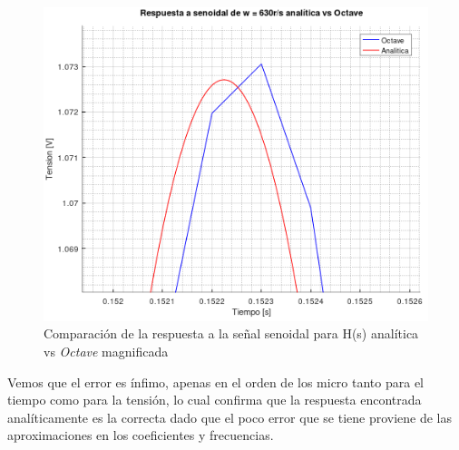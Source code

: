 \documentclass[11pt,a4paper]{report}
\begin{document}
\clearpage
\begin{figure}[ht!]
\centering
\includegraphics[scale=1]{rtaSenoidalAnaliticavsOctaveMagnificada.png}
\caption{Comparación de la respuesta a la señal senoidal para H(s) analítica vs \textit{Octave} magnificada}
\end{figure}

Vemos que el error es ínfimo, apenas en el orden de los micro tanto para el tiempo como para la tensión, lo cual confirma que la respuesta encontrada analíticamente es la correcta dado que el poco error que se tiene proviene de las aproximaciones en los coeficientes y frecuencias.
\clearpage
\end{document}
